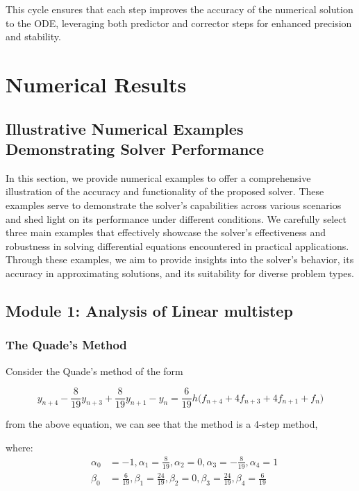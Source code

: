 \documentclass[a4paper, twoside]{report} %
\begin{document}
	This cycle ensures that each step improves the accuracy of the numerical solution to the ODE, leveraging both predictor and corrector steps for enhanced precision and stability.



	\chapter{Numerical Results}
	\section*{Illustrative Numerical Examples Demonstrating Solver Performance}

	In this section, we provide numerical examples to offer a comprehensive illustration of the accuracy and functionality of the proposed solver. These examples serve to demonstrate the solver's capabilities across various scenarios and shed light on its performance under different conditions. We carefully select three main examples that effectively showcase the solver's effectiveness and robustness in solving differential equations encountered in practical applications. Through these examples, we aim to provide insights into the solver's behavior, its accuracy in approximating solutions, and its suitability for diverse problem types.



	\section{Module 1: Analysis of Linear multistep}
	\subsection{The Quade's Method}
	Consider the Quade's method of the form \cite{lambert1977}

	\begin{equation}
		y_{n+4} - \frac{8}{19}y_{n+3} + \frac{8}{19}y_{n+1} - y_{n} =  \frac{6}{19}h\bigl(f_{n+4}+4f_{n+3}+4f_{n+1}+f_{n}\bigr)
	\end{equation}


	from the above equation, we can see that the method is a 4-step method,


	where:
	\[
	\begin{aligned}&\alpha_0 &= -1, \alpha_1 = \frac{8}{19}, \alpha_2 = 0, \alpha_3 = -\frac{8}{19}, \alpha_4 = 1 \\
		&\beta_0 &= \frac{6}{19}, \beta_1 = \frac{24}{19}, \beta_2 = 0, \beta_3 = \frac{24}{19}, \beta_4 = \frac{6}{19}
	\end{aligned}
	\]
\end{document}
